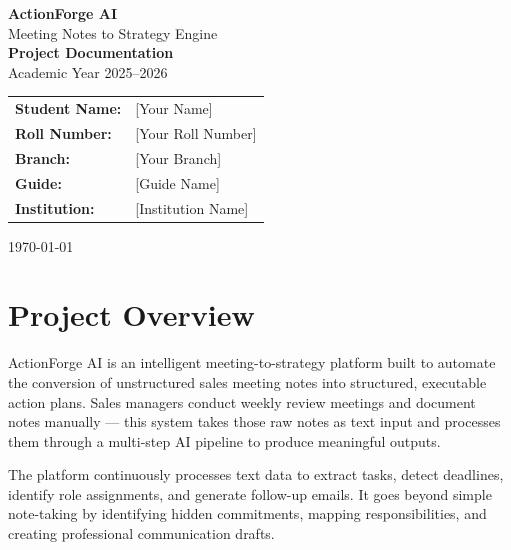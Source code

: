 \documentclass[12pt,a4paper]{article}
\begin{document}
\begin{titlepage}
\centering
\vspace*{2cm}

{\Huge\bfseries ActionForge AI}\\[0.5cm]
{\LARGE Meeting Notes to Strategy Engine}\\[2cm]

{\large\textbf{Project Documentation}}\\[0.5cm]
{\large Academic Year 2025--2026}\\[1.5cm]

\begin{tabular}{ll}
\textbf{Student Name:}  & [Your Name] \\
\textbf{Roll Number:}   & [Your Roll Number] \\
\textbf{Branch:}        & [Your Branch] \\
\textbf{Guide:}         & [Guide Name] \\
\textbf{Institution:}   & [Institution Name] \\
\end{tabular}

\vfill
{\small \today}
\end{titlepage}

\newpage
\tableofcontents
\newpage

\section{Project Overview}

ActionForge AI is an intelligent meeting-to-strategy platform built to automate the conversion of unstructured sales meeting notes into structured, executable action plans. Sales managers conduct weekly review meetings and document notes manually --- this system takes those raw notes as text input and processes them through a multi-step AI pipeline to produce meaningful outputs.

The platform continuously processes text data to extract tasks, detect deadlines, identify role assignments, and generate follow-up emails. It goes beyond simple note-taking by identifying hidden commitments, mapping responsibilities, and creating professional communication drafts.
\end{document}
